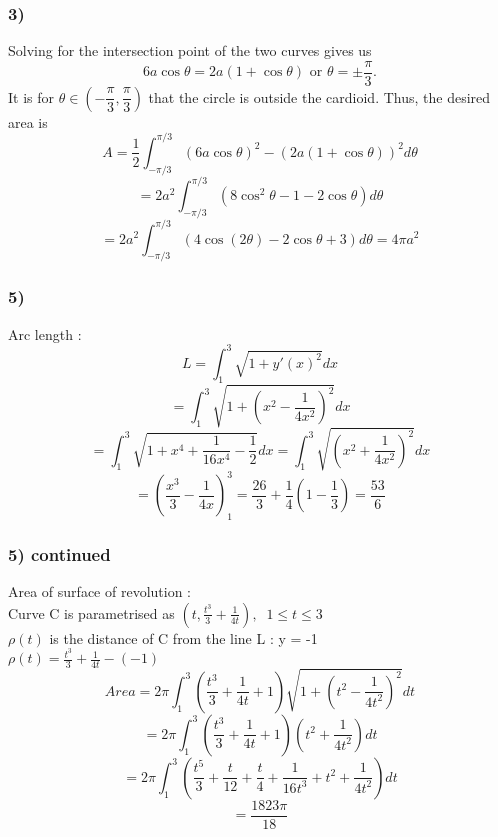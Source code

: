 \documentclass[handout]{beamer}
\begin{document}
\begin{frame}
	\frametitle{3)}
	Solving for the intersection point of the two curves gives us
	\[6a\cos\theta = 2a(1+\cos\theta) \text{ or } \theta = \pm\frac{\pi}{3}.\]
	It is for $\theta \in \left(-\dfrac{\pi}{3}, \dfrac{\pi}{3}\right)$ that the circle is outside the cardioid. Thus, the desired area is
	\[A = \frac{1}{2}\int_{-\pi/3}^{\pi/3} (6a\cos\theta)^2 - (2a(1 + \cos\theta))^2 d\theta \]
    \[ = 2a^2\int_{-\pi/3}^{\pi/3} (8\cos^2\theta - 1 - 2\cos\theta) d\theta\]
	\[= 2a^2\int_{-\pi/3}^{\pi/3} (4\cos(2\theta) - 2\cos\theta + 3) d\theta = 4\pi a^2 \]
\end{frame}



\begin{frame}
	\frametitle{5)}
	Arc length :
	\[L = \int_{1}^{3}\sqrt{1+y'(x)^{2}} dx \]
	\[ = \int_{1}^{3}\sqrt{1+(x^{2}- \frac{1}{4x^{2}})^{2} } dx  \]
	\[ = \int_{1}^{3}\sqrt{1+x^{4} + \frac{1}{16x^{4}} - \frac{1}{2} } dx   = \int_{1}^{3}\sqrt{(x^{2} + \frac{1}{4x^{2}})^{2} }dx \]
	\[= \left(\frac{x^{3}}{3} - \frac{1}{4x}\right)_{1}^{3} = \frac{26}{3} + \frac{1}{4}(1-\frac{1}{3}) = \frac{53}{6}\]
\end{frame}

\begin{frame}
	\frametitle{5) continued}
	Area of surface of revolution : \\
	Curve C is parametrised as $(t,\frac{t^{3}}{3} + \frac{1}{4t}), \; \; 1 \le t \le 3$ \\
	$\rho(t)$ is the distance of C from the line L : y = -1 \\
	$\rho(t) = \frac{t^{3}}{3} + \frac{1}{4t} - (-1)$
	\[Area = 2 \pi \int_{1}^{3}(\frac{t^{3}}{3} + \frac{1}{4t} +1)\sqrt{1+(t^{2}- \frac{1}{4t^{2}})^{2} } dt \]
	\[ =  2 \pi \int_{1}^{3}(\frac{t^{3}}{3} + \frac{1}{4t} +1)(t^{2} + \frac{1}{4t^{2}}) dt \]
	\[ = 2 \pi \int_{1}^{3}(\frac{t^{5}}{3} + \frac{t}{12} +  \frac{t}{4} + \frac{1}{16t^{3}} + t^{2} + \frac{1}{4t^{2}}) dt \]
	\[= \frac{1823 \pi}{18}\]
\end{frame}

\end{document}
